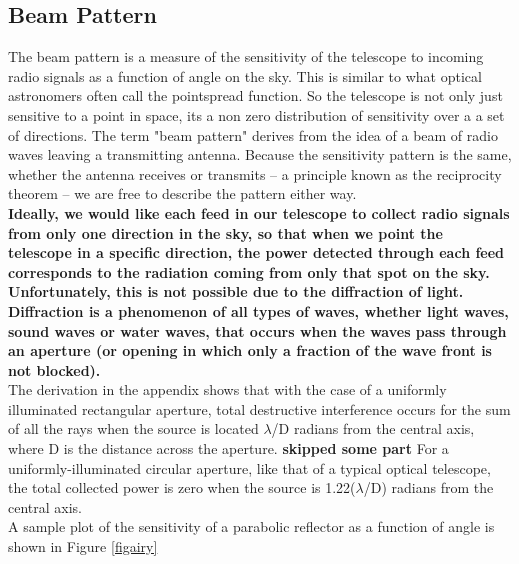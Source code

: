 \documentclass[10pt]{report}
\begin{document}
\subsection{Beam Pattern}
The beam pattern is a measure of the sensitivity of the telescope to incoming radio signals as a function of angle on the sky.  This is similar to what optical astronomers often call the pointspread function. So the telescope is not only just sensitive to a point in space, its a non zero distribution of sensitivity over a a set of directions.  The term "beam pattern" derives from the idea of a beam of radio waves leaving a transmitting antenna.  Because the sensitivity pattern is the same, whether the antenna receives or transmits -- a principle known as the reciprocity theorem -- we are free to describe the pattern either way. \\
\textbf{ Ideally, we would like each feed in our telescope to collect radio signals from only one direction in the sky, so that when we point the telescope in a specific direction, the power detected through each feed corresponds to the radiation coming from only that spot on the sky.  Unfortunately, this is not possible due to the diffraction of light. Diffraction is a phenomenon of all types of waves, whether light waves, sound waves or water waves, that occurs when the waves pass through an aperture (or opening in which only a fraction of the wave front is not blocked).}\\
 The derivation in the appendix shows that with the case of a uniformly illuminated rectangular aperture, total destructive interference occurs for the sum of all the rays when the source is located $\lambda$/D radians from the central axis, where D is the distance across the aperture. \textbf{skipped some part} For a uniformly-illuminated circular aperture, like that of a typical optical telescope, the total collected power is zero when the source is 1.22($\lambda$/D) radians from the central axis. \\
  A sample plot of the sensitivity of a parabolic reflector as a function of angle is shown in Figure \ref{figairy}\\
\end{document}
